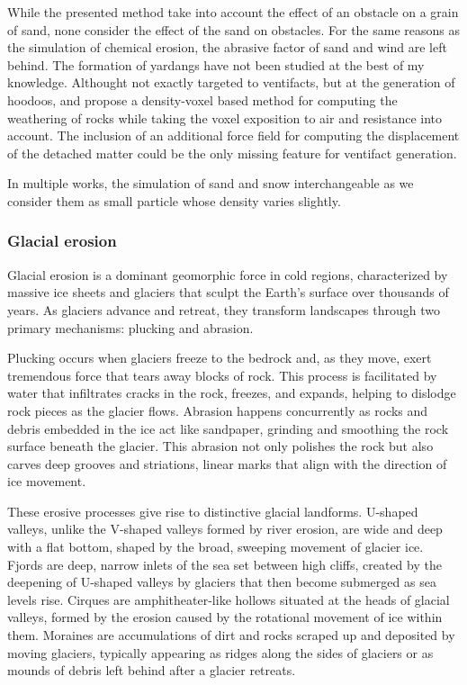 While the presented method take into account the effect of an obstacle on a grain of sand, none consider the effect of the sand on obstacles. For the same reasons as the simulation of chemical erosion, the abrasive factor of sand and wind are left behind. The formation of yardangs have not been studied at the best of my knowledge. Althought not exactly targeted to ventifacts, but at the generation of hoodoos, \cite{Beardall2007} and \cite{Jones2010} propose a density-voxel based method for computing the weathering of rocks while taking the voxel exposition to air and resistance into account. The inclusion of an additional force field for computing the displacement of the detached matter could be the only missing feature for ventifact generation.

In multiple works, the simulation of sand and snow interchangeable as we consider them as small particle whose density varies slightly.

\subsubsection{Glacial erosion}
Glacial erosion is a dominant geomorphic force in cold regions, characterized by massive ice sheets and glaciers that sculpt the Earth's surface over thousands of years. As glaciers advance and retreat, they transform landscapes through two primary mechanisms: plucking and abrasion.

Plucking occurs when glaciers freeze to the bedrock and, as they move, exert tremendous force that tears away blocks of rock. This process is facilitated by water that infiltrates cracks in the rock, freezes, and expands, helping to dislodge rock pieces as the glacier flows. Abrasion happens concurrently as rocks and debris embedded in the ice act like sandpaper, grinding and smoothing the rock surface beneath the glacier. This abrasion not only polishes the rock but also carves deep grooves and striations, linear marks that align with the direction of ice movement.

These erosive processes give rise to distinctive glacial landforms. U-shaped valleys, unlike the V-shaped valleys formed by river erosion, are wide and deep with a flat bottom, shaped by the broad, sweeping movement of glacier ice. Fjords are deep, narrow inlets of the sea set between high cliffs, created by the deepening of U-shaped valleys by glaciers that then become submerged as sea levels rise. Cirques are amphitheater-like hollows situated at the heads of glacial valleys, formed by the erosion caused by the rotational movement of ice within them. Moraines are accumulations of dirt and rocks scraped up and deposited by moving glaciers, typically appearing as ridges along the sides of glaciers or as mounds of debris left behind after a glacier retreats.

